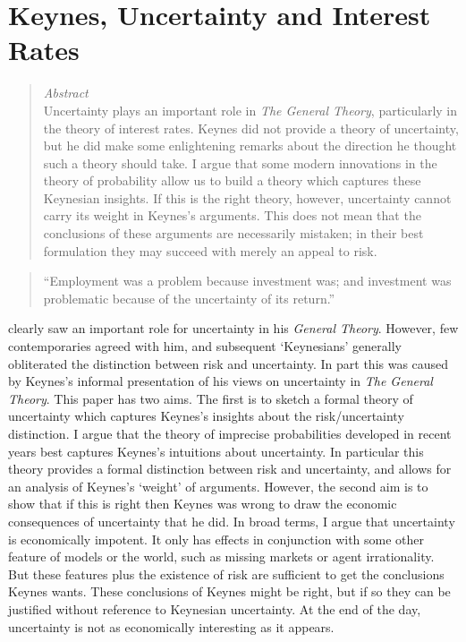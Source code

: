
%
%
%
%
%
%
%
%
%
%
\chapter{Keynes, Uncertainty and Interest Rates}


\begin{quote}
\textit{Abstract}\\
Uncertainty plays an important role in \textit{The General Theory}, particularly in the theory of interest rates. Keynes did not provide a theory of uncertainty, but he did make some enlightening remarks about the direction he thought such a theory should take. I argue that some modern innovations in the theory of probability allow us to build a theory which captures these Keynesian insights. If this is the right theory, however, uncertainty cannot carry its weight in Keynes's arguments. This does not mean that the conclusions of these arguments are necessarily mistaken; in their best formulation they may succeed with merely an appeal to risk.
\end{quote}

\begin{quote}
``Employment was a problem because investment was; and investment was problematic because of the uncertainty of its return.'' \cite[83]{Shapiro1997}
\end{quote}

\noindent \citeauthor{Keynes1936} clearly saw an important role for uncertainty in his \textit{General Theory}. However, few contemporaries agreed with him, and subsequent `Keynesians' generally obliterated the distinction between risk and uncertainty. In part this was caused by Keynes's informal presentation of his views on uncertainty in \textit{The General Theory}. This paper has two aims. The first is to sketch a formal theory of uncertainty which captures Keynes's insights about the risk/uncertainty distinction. I argue that the theory of imprecise probabilities developed in recent years best captures Keynes's intuitions about uncertainty. In particular this theory provides a formal distinction between risk and uncertainty, and allows for an analysis of Keynes's `weight' of arguments. However, the second aim is to show that if this is right then Keynes was wrong to draw the economic consequences of uncertainty that he did. In broad terms, I argue that uncertainty is economically impotent. It only has effects in conjunction with some other feature of models or the world, such as missing markets or agent irrationality. But these features plus the existence of risk are sufficient to get the conclusions Keynes wants. These conclusions of Keynes might be right, but if so they can be justified without reference to Keynesian uncertainty. At the end of the day, uncertainty is not as economically interesting as it appears.


